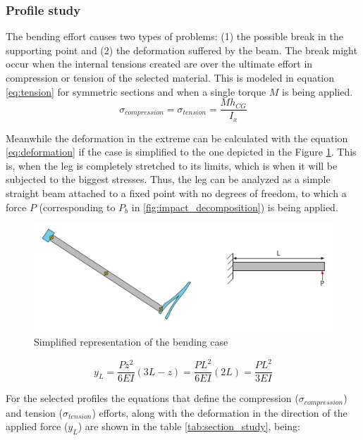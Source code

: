 \subsubsection{Profile study} %
\label{ssub:profile_study}
  The bending effort causes two types of problems: (1) the possible break in the supporting point and (2) the deformation suffered by the beam.
  The break might occur when the internal tensions created are over the ultimate effort in compression or tension of the selected material.
  This is modeled in equation \ref{eq:tension} for symmetric sections and when a single torque $M$ is being applied.
  \begin{equation}
  \label{eq:tension}
    \sigma _{compression} = \sigma _{tension} = \frac{M h_{CG}}{I_x}
  \end{equation}

  Meanwhile the deformation in the extreme can be calculated with the equation \ref{eq:deformation} if the case is simplified to the one depicted in the Figure \ref{fig:bending_case}.
  This is, when the leg is completely stretched to its limits, which is when it will be subjected to the biggest stresses.
  Thus, the leg can be analyzed as a simple straight beam attached to a fixed point with no degrees of freedom, to which a force $P$ (corresponding to $P_{b}$ in \ref{fig:impact_decomposition}) is being applied.

  \begin{figure}[ht!]
    \centering
    \includegraphics[width=\textwidth]{figures/bending_case.pdf}
    \caption{Simplified representation of the bending case}
    \label{fig:bending_case}
  \end{figure}

  \begin{equation}
  \label{eq:deformation}
    y_L = \frac{P z^2}{6EI}(3L-z) = \frac{P L^2}{6EI}(2L) = \frac{P L^2}{3EI}
  \end{equation}


  For the selected profiles the equations that define the compression ($\sigma _{compression}$) and tension ($\sigma _{tension}$) efforts, along with the deformation in the direction of the applied force ($y_L$) are shown in the table \ref{tab:section_study}, being:


